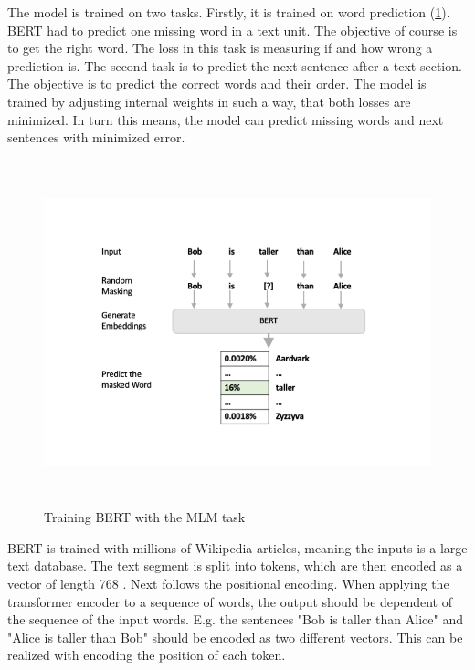            
           The model is trained on two tasks. Firstly, it is trained on word prediction (\ref{fig:mlm}). \ac{BERT} had to predict one missing word in a text unit. The objective of course is to get the right word. The loss in this task is measuring if and how wrong a prediction is. The second task is to predict the next sentence after a text section. The objective is to predict the correct words and their order. The model is trained by adjusting internal weights in such a way, that both losses are minimized. In turn this means, the model can predict missing words and next sentences with minimized error.
           
          
             \begin{figure}[h!]
             	
             	\centering
             	\includegraphics[height=10cm]{ Bilder/preprocessing/BERT/BERT-language-modeling-masked-lm.png}
             	\caption[Training BERT with the MLM task]{Training BERT with the MLM task \cite{alammarIllustratedBERTELMo}}
         		\label{fig:mlm}    
         \end{figure}
            
         
               BERT is trained with millions of Wikipedia articles, meaning the inputs is a large text database. The text segment is split into tokens, which are then encoded as a vector of length 768 \cite[p.~3]{BERT}. Next follows the positional encoding. When applying the transformer encoder to a sequence of words, the output should be dependent of the sequence of the input words. E.g. the sentences "Bob is taller than Alice" and "Alice is taller than Bob" should be encoded as two different vectors. This can be realized with encoding the position of each token. 
               

